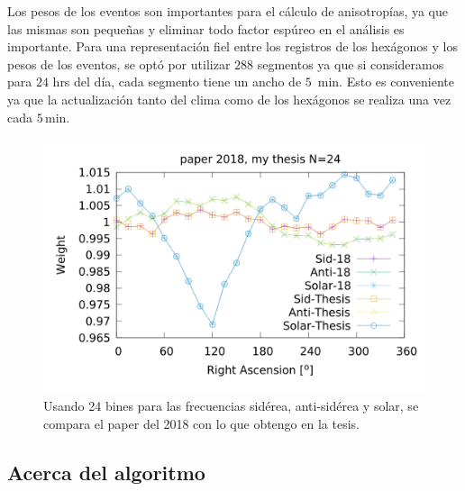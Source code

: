 	Los pesos de los eventos son importantes para el cálculo de anisotropías, ya que las mismas son pequeñas y eliminar todo factor espúreo en el análisis es importante. Para una representación fiel entre los registros de los hexágonos y los pesos de los eventos, se optó por utilizar $288$ segmentos ya que si consideramos para $24$ hrs del día, cada segmento tiene un ancho de $5$\, min. Esto es conveniente ya que la actualización tanto del clima como de los hexágonos se realiza una vez cada $5$\,min.

	\begin{figure}[H]
	\centering
	\includegraphics[width=\linewidth]{Graficos/solar_anti_sid_my_and_paper_in_24.png}
	\caption{Usando 24 bines para las frecuencias sidérea, anti-sidérea y solar, se compara el paper del 2018 con lo que obtengo en la tesis.}
	\label{fig:all_24}
	\end{figure}



\subsection{Acerca del algoritmo}



